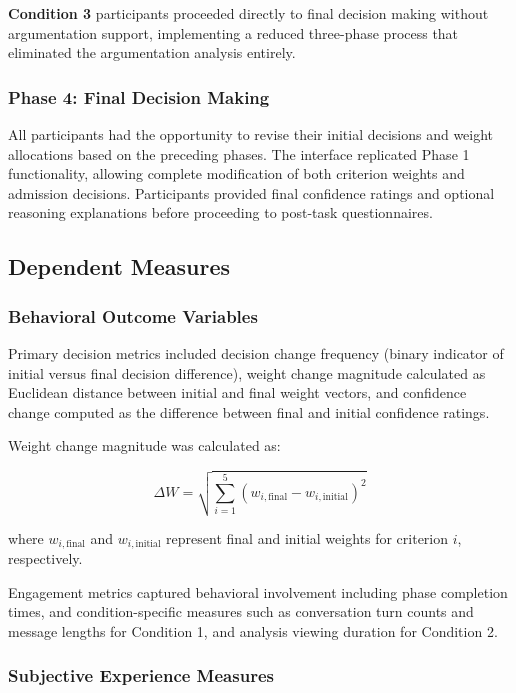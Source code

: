 \documentclass[conference]{IEEEtran}
\begin{document}
\textbf{Condition 3} participants proceeded directly to final decision making without argumentation support, implementing a reduced three-phase process that eliminated the argumentation analysis entirely.

\subsubsection{Phase 4: Final Decision Making}

All participants had the opportunity to revise their initial decisions and weight allocations based on the preceding phases. The interface replicated Phase 1 functionality, allowing complete modification of both criterion weights and admission decisions. Participants provided final confidence ratings and optional reasoning explanations before proceeding to post-task questionnaires.

\subsection{Dependent Measures}

\subsubsection{Behavioral Outcome Variables}

Primary decision metrics included decision change frequency (binary indicator of initial versus final decision difference), weight change magnitude calculated as Euclidean distance between initial and final weight vectors, and confidence change computed as the difference between final and initial confidence ratings.

Weight change magnitude was calculated as:

\begin{equation}
\Delta W = \sqrt{\sum_{i=1}^{5} (w_{i,\text{final}} - w_{i,\text{initial}})^2}
\end{equation}

where $w_{i,\text{final}}$ and $w_{i,\text{initial}}$ represent final and initial weights for criterion $i$, respectively.

Engagement metrics captured behavioral involvement including phase completion times, and condition-specific measures such as conversation turn counts and message lengths for Condition 1, and analysis viewing duration for Condition 2.

\subsubsection{Subjective Experience Measures}
\end{document}
